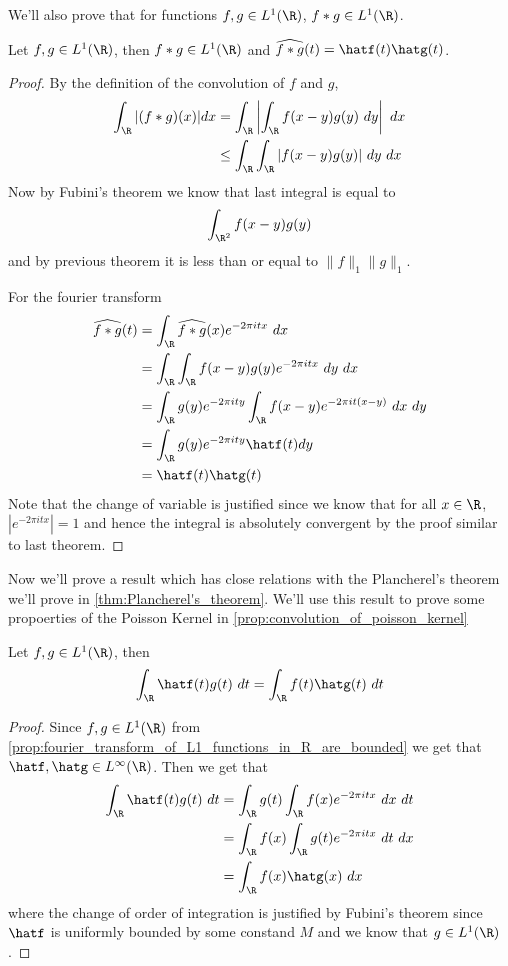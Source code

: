   We'll also prove that for functions $f, g \in L^1(\R)$, $f*g \in L^1(\R)$.
  \begin{proposition}
    \label{prop:convolution_is_well_defined_in_L^1(R)}
    Let $f, g \in L^1(\R)$, then $f*g \in L^1(\R)$ and $\widehat{f*g}(t) = \hatf(t)\hatg(t)$.
  \end{proposition}
  \begin{proof}
    By the definition of the convolution of $f$ and $g$, 
    \begin{align*}
      \int_\R|(f*g)(x)| dx &= \int_\R \left| \int_\R f(x-y)g(y) \ dy \right| \ dx \\
      & \le \int_\R \int_\R |f(x-y)g(y)| \ dy \ dx
    \end{align*}
    Now by Fubini's theorem we know that last integral is equal to $$\int_{\R^2}f(x-y)g(y) $$ and by previous theorem it is less than or equal to $\|f\|_1\|g\|_1$.

    For the fourier transform
    \begin{align*}
      \widehat{f*g}(t) &= \int_\R \widehat{f*g}(x) e^{-2 \pi itx} \ dx \\
      &= \int_\R \int_\R f(x-y)g(y) e^{-2 \pi itx} \ dy \ dx \\
      &= \int_\R g(y)e^{-2 \pi ity}\int_\R f(x-y) e^{-2 \pi it (x-y)} \ dx \ dy \\
      &= \int_\R g(y)e^{-2 \pi ity} \hatf(t) dy \\
      &= \hatf(t) \hatg(t) \\
    \end{align*}
    Note that the change of variable is justified since we know that  for all $x \in \R$, $|e^{-2\pi itx}| = 1$ and hence the integral is absolutely convergent by the proof similar to last theorem. 
  \end{proof}

  Now we'll prove a result which has close relations with the Plancherel's theorem we'll prove in \autoref{thm:Plancherel's_theorem}. We'll use this result to prove some propoerties of the Poisson Kernel in \autoref{prop:convolution_of_poisson_kernel}
\begin{proposition}
  \label{prop:plancherel_theorem_in_L1}
  Let $f, g \in L^1(\R)$, then $$\int_\R \hatf(t) g(t) \ dt = \int_\R f(t) \hatg(t) \ dt$$
\end{proposition}
\begin{proof}
  Since $f, g \in L^1(\R)$ from \autoref{prop:fourier_transform_of_L1_functions_in_R_are_bounded} we get that $\hatf, \hatg \in L^\infty(\R)$. Then we get that 
  \begin{align*}
    \int_\R \hatf(t) g(t) \ dt &= \int_\R g(t) \int_\R f(x) e^{-2\pi itx} \ dx \ dt \\
    & = \int_\R f(x) \int_\R g(t) e^{-2\pi itx} \ dt \ dx \\
    & = \int_\R f(x)\hatg(x) \ dx
  \end{align*}
  where the change of order of integration is justified by Fubini's theorem since $\hatf$ is uniformly bounded by some constand $M$ and we know that $g \in L^1(\R)$.
\end{proof}

